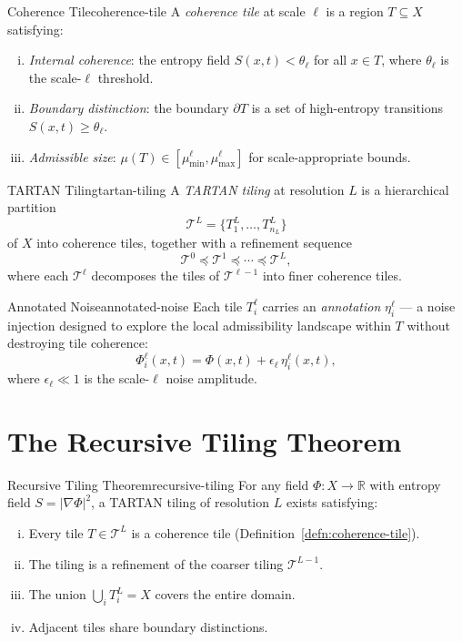 \documentclass[12pt,twoside,openright]{book}
\begin{document}
\begin{definition}{Coherence Tile}{coherence-tile}
  A \emph{coherence tile} at scale $\ell$ is a region
  $T \subseteq X$ satisfying:
  \begin{enumerate}[(i)]
    \item \emph{Internal coherence}: the entropy field
          $S(x, t) < \theta_\ell$ for all $x \in T$,
          where $\theta_\ell$ is the scale-$\ell$
          threshold.
    \item \emph{Boundary distinction}: the boundary
          $\partial T$ is a set of high-entropy transitions
          $S(x,t) \ge \theta_\ell$.
    \item \emph{Admissible size}: $\mu(T) \in
          [\mu_{\min}^\ell, \mu_{\max}^\ell]$ for
          scale-appropriate bounds.
  \end{enumerate}
\end{definition}

\begin{definition}{TARTAN Tiling}{tartan-tiling}
  A \emph{TARTAN tiling} at resolution $L$ is a
  hierarchical partition
  \[
    \mathcal{T}^L = \{T^L_1, \ldots, T^L_{n_L}\}
  \]
  of $X$ into coherence tiles, together with a
  refinement sequence
  \[
    \mathcal{T}^0 \preceq \mathcal{T}^1 \preceq
    \cdots \preceq \mathcal{T}^L,
  \]
  where each $\mathcal{T}^\ell$ decomposes the tiles of
  $\mathcal{T}^{\ell-1}$ into finer coherence tiles.
\end{definition}

\begin{definition}{Annotated Noise}{annotated-noise}
  Each tile $T^\ell_i$ carries an \emph{annotation}
  $\eta^\ell_i$ — a noise injection designed to
  explore the local admissibility landscape within $T$
  without destroying tile coherence:
  \[
    \Phi^\ell_i(x,t)
    = \Phi(x,t) + \epsilon_\ell \, \eta^\ell_i(x,t),
  \]
  where $\epsilon_\ell \ll 1$ is the scale-$\ell$
  noise amplitude.
\end{definition}

\section{The Recursive Tiling Theorem}

\begin{theorem}{Recursive Tiling Theorem}{recursive-tiling}
  For any field $\Phi: X \to \mathbb{R}$ with entropy
  field $S = |\nabla \Phi|^2$, a TARTAN tiling of
  resolution $L$ exists satisfying:
  \begin{enumerate}[(i)]
    \item Every tile $T \in \mathcal{T}^L$ is a coherence
          tile (Definition~\ref{defn:coherence-tile}).
    \item The tiling is a refinement of the coarser
          tiling $\mathcal{T}^{L-1}$.
    \item The union $\bigcup_i T^L_i = X$ covers the
          entire domain.
    \item Adjacent tiles share boundary distinctions.
  \end{enumerate}
\end{theorem}
\end{document}
